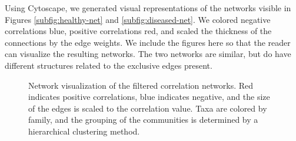 Using Cytoscape, we generated visual representations of the networks visible in Figures \ref{subfig:healthy-net} and \ref{subfig:diseased-net}. We colored negative correlations blue, positive correlations red, and scaled the thickness of the connections by the edge weights. We include the figures here so that the reader can visualize the resulting networks. The two networks are similar, but do have different structures related to the exclusive edges present. 

\begin{figure}[!hbt]
\centering
{}
    \hfill
{}
\caption[Network visualization of the filtered correlation networks.]{Network visualization of the filtered correlation networks. Red indicates positive correlations, blue indicates negative, and the size of the edges is scaled to the correlation value. Taxa are colored by family, and the grouping of the communities is determined by a hierarchical clustering method.}
\label{fig:vis-plots}
\end{figure}

